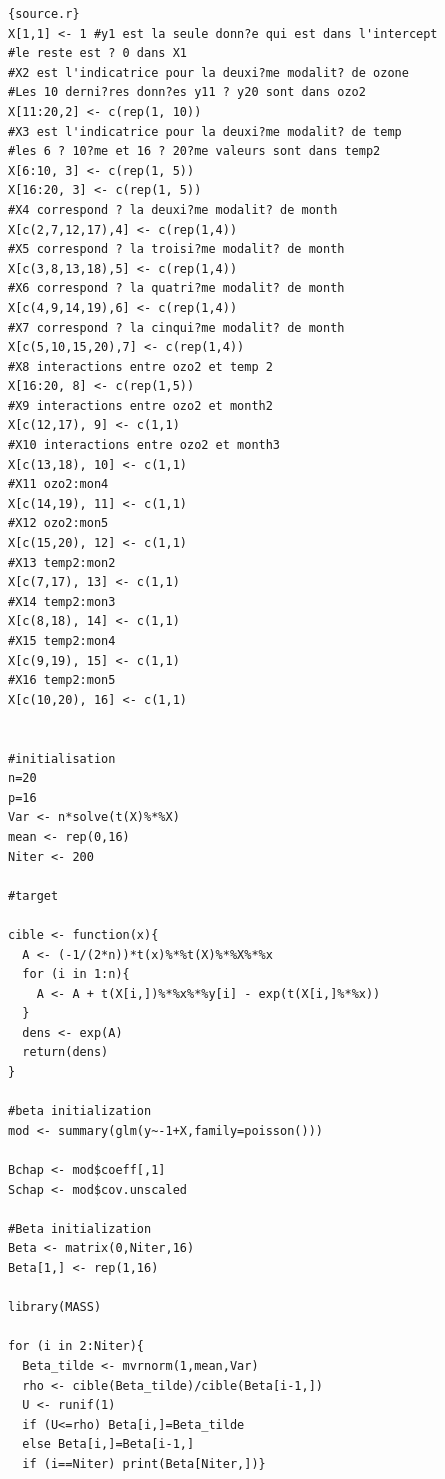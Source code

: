 \documentclass[french,12pt]{report}
\newcommand{\<}{\langle}
\renewcommand{\>}{\rangle}
\theoremstyle{definition}
\begin{document}
\begin{appendix}
\begin{lstlisting}{source.r}
X[1,1] <- 1 #y1 est la seule donn?e qui est dans l'intercept
#le reste est ? 0 dans X1
#X2 est l'indicatrice pour la deuxi?me modalit? de ozone
#Les 10 derni?res donn?es y11 ? y20 sont dans ozo2
X[11:20,2] <- c(rep(1, 10))
#X3 est l'indicatrice pour la deuxi?me modalit? de temp
#les 6 ? 10?me et 16 ? 20?me valeurs sont dans temp2
X[6:10, 3] <- c(rep(1, 5))
X[16:20, 3] <- c(rep(1, 5))
#X4 correspond ? la deuxi?me modalit? de month
X[c(2,7,12,17),4] <- c(rep(1,4))
#X5 correspond ? la troisi?me modalit? de month
X[c(3,8,13,18),5] <- c(rep(1,4))
#X6 correspond ? la quatri?me modalit? de month
X[c(4,9,14,19),6] <- c(rep(1,4))
#X7 correspond ? la cinqui?me modalit? de month
X[c(5,10,15,20),7] <- c(rep(1,4))
#X8 interactions entre ozo2 et temp 2
X[16:20, 8] <- c(rep(1,5))
#X9 interactions entre ozo2 et month2
X[c(12,17), 9] <- c(1,1)
#X10 interactions entre ozo2 et month3
X[c(13,18), 10] <- c(1,1)
#X11 ozo2:mon4
X[c(14,19), 11] <- c(1,1)
#X12 ozo2:mon5
X[c(15,20), 12] <- c(1,1)
#X13 temp2:mon2
X[c(7,17), 13] <- c(1,1)
#X14 temp2:mon3
X[c(8,18), 14] <- c(1,1)
#X15 temp2:mon4
X[c(9,19), 15] <- c(1,1)
#X16 temp2:mon5
X[c(10,20), 16] <- c(1,1)


#initialisation 
n=20
p=16
Var <- n*solve(t(X)%*%X)
mean <- rep(0,16)
Niter <- 200

#target 

cible <- function(x){
  A <- (-1/(2*n))*t(x)%*%t(X)%*%X%*%x
  for (i in 1:n){
    A <- A + t(X[i,])%*%x%*%y[i] - exp(t(X[i,]%*%x))
  }
  dens <- exp(A)
  return(dens)
}

#beta initialization
mod <- summary(glm(y~-1+X,family=poisson()))

Bchap <- mod$coeff[,1]
Schap <- mod$cov.unscaled

#Beta initialization
Beta <- matrix(0,Niter,16)
Beta[1,] <- rep(1,16)

library(MASS)

for (i in 2:Niter){
  Beta_tilde <- mvrnorm(1,mean,Var)
  rho <- cible(Beta_tilde)/cible(Beta[i-1,])
  U <- runif(1)
  if (U<=rho) Beta[i,]=Beta_tilde
  else Beta[i,]=Beta[i-1,]
  if (i==Niter) print(Beta[Niter,])}


\end{lstlisting}

\end{appendix}
\end{document}
